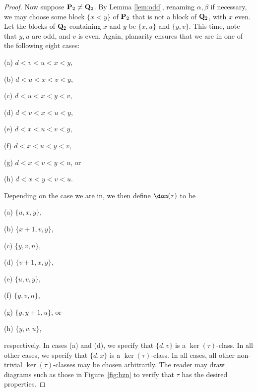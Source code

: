 \begin{proof}
\bigskip{}  Now suppose ${\bf P}_2\not={\bf Q}_2$.  By Lemma \ref{lem:odd}, renaming $\alpha,\beta$ if necessary, we may choose some block $\{x<y\}$ of ${\bf P}_2$ that is not a block of ${\bf Q}_2$, with $x$ even.  Let the blocks of ${\bf Q}_2$ containing $x$ and $y$ be $\{x,u\}$ and $\{y,v\}$.  This time, note that $y,u$ are odd, and $v$ is even.  Again, planarity ensures that we are in one of the following eight cases:
\begin{itemize}
\begin{multicols}{4}
\item[(a)] $d<v<u<x<y$,
\item[(b)] $d<u<x<v<y$,
\item[(c)] $d<u<x<y<v$,
\item[(d)] $d<v<x<u<y$,
\item[(e)] $d<x<u<v<y$,
\item[(f)] $d<x<u<y<v$,
\item[(g)] $d<x<v<y<u$, or
\item[(h)] $d<x<y<v<u$.
\end{multicols}
\end{itemize}
Depending on the case we are in, we then define $\dom(\tau)$ to be
\begin{itemize}
\begin{multicols}{4}
\item[(a)] $\{u,x,y\}$,
\item[(b)] $\{x+1,v,y\}$,
\item[(c)] $\{y,v,n\}$,
\item[(d)] $\{v+1,x,y\}$,
\item[(e)] $\{u,v,y\}$,
\item[(f)] $\{y,v,n\}$,
\item[(g)] $\{y,y+1,u\}$, or
\item[(h)] $\{y,v,u\}$,
\end{multicols}
\end{itemize}
respectively.
In cases (a) and (d), we specify that $\{d,v\}$ is a $\ker(\tau)$-class.  In all other cases, we specify that $\{d,x\}$ is a $\ker(\tau)$-class.  In all cases, all other non-trivial $\ker(\tau)$-classes may be chosen arbitrarily.  The reader may draw diagrams such as those in Figure~\ref{fig:bzn} to verify that $\tau$ has the desired properties. \end{proof}








